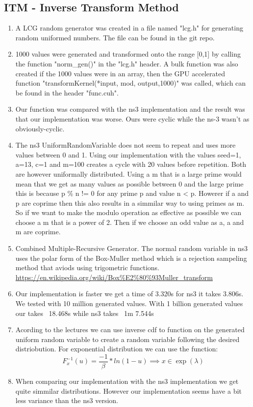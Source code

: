 \documentclass{article}
\begin{document}
  \subsection{ITM - Inverse Transform Method}

\begin{enumerate}
  \item A LCG random generator was created in a file named "lcg.h" for generating random uniformed numbers. The file can be found in the git repo.
  \item 1000 values were generated and transformed onto the range [0,1] by calling the function "norm\_gen()" in the "lcg.h" header. A bulk function was also created if the 1000 values were in an array, then the GPU accelerated function "transformKernel(*input, mod, output,1000)" was called, which can be found in the header "func.cuh".
  \item Our function was compared with the ns3 implementation and the result was that our implementation was worse. Ours were cyclic while the ns-3 wasn't as obviously-cyclic.
  \item The ns3 UniformRandomVariable does not seem to repeat and uses more values between 0 and 1. Using our implementation with the values seed=1, a=13, c=1 and m=100 creates a cycle with 20 values before repetition. Both are however uniformally distributed. Using a m that is a large prime would mean that we get as many values as possible between 0 and the large prime this is because p \% n != 0 for any prime p and value n < p. Howerer if a and p are coprime then this also results in a simmilar way to using primes as m. So if we want to make the modulo operation as effective as possible we can choose a m that is a power of 2. Then if we choose an odd value as a, a and m are coprime.
  \item Combined Multiple-Recursive Generator. The normal random variable in ns3 uses the polar form of the Box-Muller method which is a rejection sampeling method that aviods using trigometric functions. \url{https://en.wikipedia.org/wiki/Box\%E2\%80\%93Muller_transform}
  \item Our implementation is faster we get a time of 3.320s for ns3 it takes 3.806s. We tested with 10 million generated values. With 1 billion generated values our takes ~18.468s while ns3 takes ~1m 7.544s
  \item Acording to the lectures we can use inverse cdf to function on the generated uniform random variable to create a random variable following the desired distriobution. For exponential distribution we can use the function:$$ F^{-1}_x(u) = \frac{-1}{\beta} * ln(1-u) \implies x \in \exp{(\lambda)} $$
  \item When comparing our implementation with the ns3 implementation we get quite simmilar distributions. However our implementation seems have a bit less variance than the ns3 version.
\end{enumerate}
\end{document}
